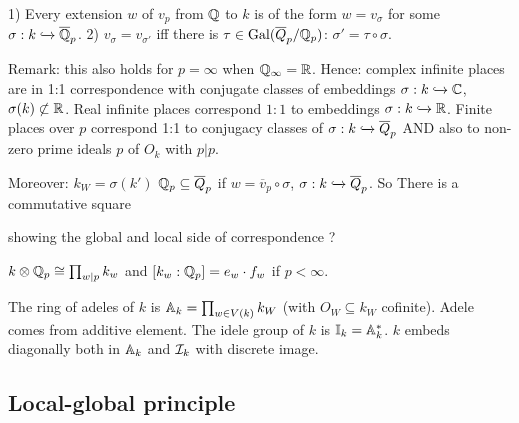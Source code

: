 \begin{outline}
\0 \begin{theorem}
    1) Every extension $w$ of $v_p$ from $\mathbb{Q}$ to $k$ is of the form $w=v_\sigma$ for some $\sigma: k \xhookrightarrow{} \overline{\mathbb{Q}}_p$.  
    2) $v_\sigma = v_{\sigma'}$ iff there is $\tau \in \operatorname{Gal}({\overline{Q}_p/\mathbb{Q}_p})$: $\sigma' = \tau \circ \sigma$. 
\end{theorem}

\0 Remark: this also holds for $p=\infty$ when $\mathbb{Q}_\infty = \mathbb{R}$. Hence: complex infinite places are in 1:1 correspondence with conjugate classes of embeddings $\sigma: k \xhookrightarrow{} \mathbb{C}$, $\sigma(k)\not\subset \mathbb{R}$. Real infinite places correspond $1:1$ to embeddings $\sigma: k \xhookrightarrow{} \mathbb{R}$. Finite places over $p$ correspond 1:1 to conjugacy classes of $\sigma: k\xhookrightarrow{} \overline{Q}_p$ AND also to non-zero prime ideals $p$ of $O_k$ with $p|p$.

\0 Moreover: $k_W = \sigma(k')$ $\mathbb{Q}_p \subseteq \overline{Q}_p$ if $w=\overline{v}_p \circ \sigma$, $\sigma:k\xhookrightarrow{} \overline{Q}_p$. So There is a commutative square 


showing the global and local side of correspondence ? 

\0 \begin{theorem}
    $k\otimes \mathbb{Q}_p \cong \prod_{w | p} k_w$ and $[k_w : \mathbb{Q}_p] = e_w \cdot f_w$ if $p<\infty$.  
\end{theorem}

\0 \begin{definition}
    The ring of adeles of $k$ is $\mathbb{A}_k = \prod_{w \in V(k)} k_W$ (with $O_W \subseteq k_W$ cofinite). Adele comes from additive element. The idele group of $k$ is $\mathbb{I}_k = \mathbb{A}^*_k$. $k$ embeds diagonally both in $\mathbb{A}_k$ and $\mathcal{I}_k$ with discrete image.
\end{definition}
\end{outline}

\subsection{Local-global principle}

